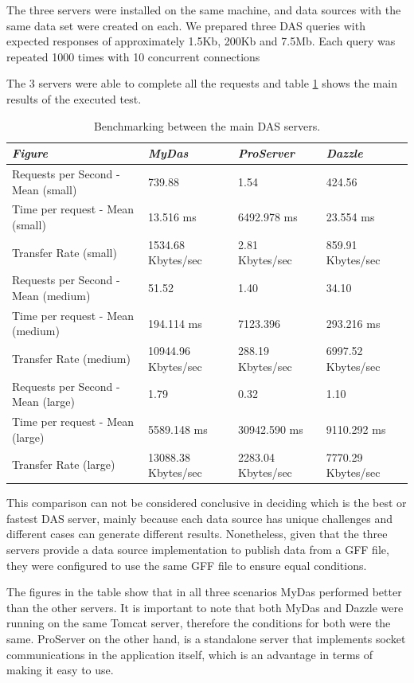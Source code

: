 The three servers were installed on the same machine, and data sources with the same data set were created on each. We prepared three DAS queries with expected responses of approximately 1.5Kb, 200Kb and 7.5Mb. Each query was repeated 1000 times with 10 concurrent connections

The 3 servers were able to complete all the requests and table \ref{tab:table2} shows the main results of the executed test.

\begin{table}[!ht]
        \begin{tabular}{|p{6cm}|p{3cm}|p{3cm}|p{3cm}|}
\hline 
\emph{Figure} & \emph{MyDas} & \emph{ProServer} & \emph{Dazzle}\\
\hline 
Requests per Second - Mean (small) & 739.88 & 1.54 & 424.56\\
\hline 
Time per request - Mean (small) & 13.516 ms & 6492.978 ms & 23.554 ms\\
\hline 
Transfer Rate (small) & 1534.68 Kbytes/sec & 2.81 Kbytes/sec & 859.91 Kbytes/sec\\
\hline 
Requests per Second - Mean (medium) & 51.52 & 1.40 & 34.10\\
\hline 
Time per request - Mean (medium) & 194.114 ms & 7123.396 & 293.216 ms\\
\hline 
Transfer Rate (medium) & 10944.96 Kbytes/sec & 288.19 Kbytes/sec & 6997.52 Kbytes/sec\\
\hline 
Requests per Second - Mean (large) & 1.79 & 0.32 & 1.10\\
\hline 
Time per request - Mean (large) & 5589.148 ms & 30942.590 ms & 9110.292 ms\\
\hline 
Transfer Rate (large) & 13088.38 Kbytes/sec & 2283.04 Kbytes/sec & 7770.29 Kbytes/sec\\
\hline 
        \end{tabular}
        \caption{Benchmarking between the main DAS servers.}
        \label{tab:table2}
\end{table}

This comparison can not be considered conclusive in deciding which is the best or fastest DAS server, mainly because each data source has unique challenges and different cases can generate different results. Nonetheless, given that the three servers provide a data source implementation to publish data from a GFF file, they were configured to use the same GFF file to ensure equal conditions. 

The figures in the table show that in all three scenarios MyDas performed better than the other servers. It is important to note that both MyDas and Dazzle were running on the same Tomcat server, therefore the conditions for both were the same. ProServer on the other hand, is a standalone server that implements socket communications in the application itself, which is an advantage in terms of making it easy to use.

